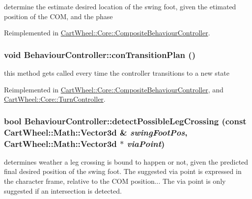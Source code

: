 determine the estimate desired location of the swing foot, given the etimated position of the COM, and the phase 

Reimplemented in \hyperlink{classCartWheel_1_1Core_1_1CompositeBehaviourController_a956bb427f158690080f381bd9cf4a089}{CartWheel::Core::CompositeBehaviourController}.

\hypertarget{classCartWheel_1_1Core_1_1BehaviourController_a26bfe1b24d791e35c78ce0dff3c7b274}{
\subsubsection[{conTransitionPlan}]{\setlength{\rightskip}{0pt plus 5cm}void BehaviourController::conTransitionPlan ()}}
\label{classCartWheel_1_1Core_1_1BehaviourController_a26bfe1b24d791e35c78ce0dff3c7b274}
this method gets called every time the controller transitions to a new state 

Reimplemented in \hyperlink{classCartWheel_1_1Core_1_1CompositeBehaviourController_a7fd8f2e351f4dd0fff087c8d254b998e}{CartWheel::Core::CompositeBehaviourController}, and \hyperlink{classCartWheel_1_1Core_1_1TurnController_afcf84411a212ce8b05b27f1ba09c7892}{CartWheel::Core::TurnController}.

\hypertarget{classCartWheel_1_1Core_1_1BehaviourController_a9ffe7d486caaf1165e0d125bed747718}{
\subsubsection[{detectPossibleLegCrossing}]{\setlength{\rightskip}{0pt plus 5cm}bool BehaviourController::detectPossibleLegCrossing (const {\bf CartWheel::Math::Vector3d} \& {\em swingFootPos}, \/  {\bf CartWheel::Math::Vector3d} $\ast$ {\em viaPoint})}}
\label{classCartWheel_1_1Core_1_1BehaviourController_a9ffe7d486caaf1165e0d125bed747718}
determines weather a leg crossing is bound to happen or not, given the predicted final desired position of the swing foot. The suggested via point is expressed in the character frame, relative to the COM position... The via point is only suggested if an intersection is detected.

